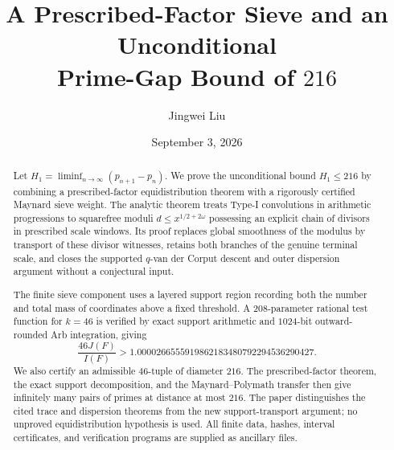 \documentclass[11pt,reqno]{amsart}
\title[An unconditional prime-gap bound of 216]
{A Prescribed-Factor Sieve and an Unconditional\\
Prime-Gap Bound of $216$}
\author{Jingwei Liu}
\date{September 3, 2026}
\numberwithin{equation}{section}
\theoremstyle{definition}
\newcommand{\1}{\mathbf 1}
\begin{document}
\begin{abstract}
Let $H_1=\liminf_{n\to\infty}(p_{n+1}-p_n)$.  We prove the
unconditional bound $H_1\le216$ by combining a prescribed-factor
equidistribution theorem with a rigorously certified Maynard sieve weight.
The analytic theorem treats Type-I convolutions in arithmetic progressions
to squarefree moduli $d\le x^{1/2+2\omega}$ possessing an explicit chain of
divisors in prescribed scale windows.  Its proof replaces global smoothness
of the modulus by transport of these divisor witnesses, retains both branches
of the genuine terminal scale, and closes the supported $q$-van der Corput
descent and outer dispersion argument without a conjectural input.

The finite sieve component uses a layered support region recording both the
number and total mass of coordinates above a fixed threshold.  A
$208$-parameter rational test function for $k=46$ is verified by exact
support arithmetic and $1024$-bit outward-rounded Arb integration, giving
\[
\frac{46J(F)}{I(F)}>
1.0000266555919862183480792294536290427.
\]
We also certify an admissible $46$-tuple of diameter $216$.  The
prescribed-factor theorem, the exact support decomposition, and the
Maynard--Polymath transfer then give infinitely many pairs of primes at
distance at most $216$.  The paper distinguishes the cited trace and
dispersion theorems from the new support-transport argument; no unproved
equidistribution hypothesis is used.  All finite data, hashes, interval
certificates, and verification programs are supplied as ancillary files.
\end{abstract}

\maketitle
\tableofcontents











\end{document}
